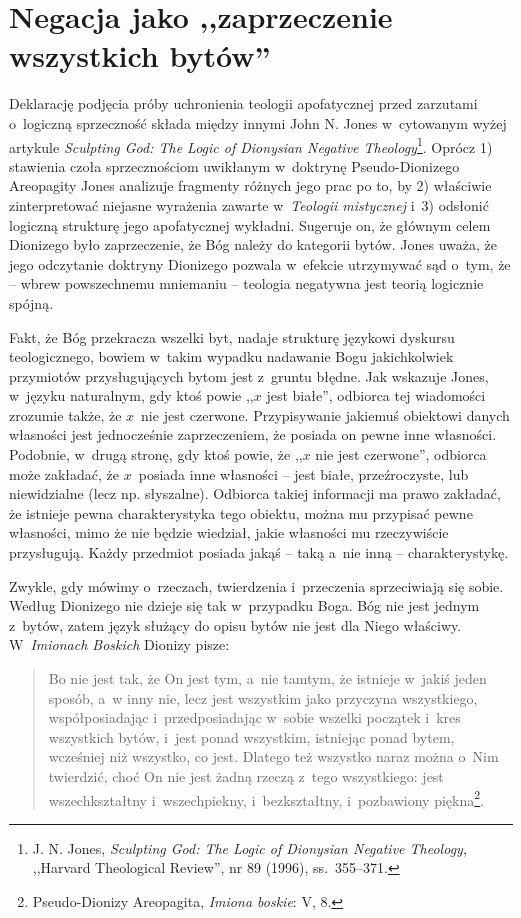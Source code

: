 \chapter{Negacja jako ,,zaprzeczenie wszystkich bytów''}\label{sil-jones}

Deklarację podjęcia próby uchronienia teologii apofatycznej przed zarzutami o~logiczną sprzeczność składa między innymi John N. Jones w~cytowanym wyżej artykule \textit{Sculpting God: The Logic of Dionysian Negative Theology}\footnote{J. N. Jones, \textit{Sculpting God: The Logic of Dionysian Negative Theology}, ,,Harvard Theological Review'', nr 89 (1996), ss.~355–371.}. Oprócz 1) stawienia czoła sprzecznościom uwikłanym w~doktrynę Pseudo-Dionizego Areopagity Jones analizuje fragmenty różnych jego prac po to, by 2) właściwie zinterpretować niejasne wyrażenia zawarte w~\textit{Teologii mistycznej} i~3) odsłonić logiczną strukturę jego apofatycznej wykładni. Sugeruje on, że głównym celem Dionizego było zaprzeczenie, że Bóg należy do kategorii bytów. Jones uważa, że jego odczytanie doktryny Dionizego pozwala w~efekcie utrzymywać sąd o~tym, że -- wbrew powszechnemu mniemaniu -- teologia negatywna jest teorią logicznie spójną.

Fakt, że Bóg przekracza wszelki byt, nadaje strukturę językowi dyskursu teologicznego, bowiem w~takim wypadku nadawanie Bogu jakichkolwiek przymiotów przysługujących bytom jest z~gruntu błędne. Jak wskazuje Jones, w~języku naturalnym, gdy ktoś powie ,,$x$ jest białe'', odbiorca tej wiadomości zrozumie także, że $x$~nie jest czerwone. Przypisywanie jakiemuś obiektowi danych własności jest jednocześnie zaprzeczeniem, że posiada on pewne inne własności. Podobnie, w~drugą stronę, gdy ktoś powie, że ,,$x$ nie jest czerwone'', odbiorca może zakładać, że $x$~posiada inne własności -- jest białe, przeźroczyste, lub niewidzialne (lecz np. słyszalne). Odbiorca takiej informacji ma prawo zakładać, że istnieje pewna charakterystyka tego obiektu, można mu przypisać pewne własności, mimo że nie będzie wiedział, jakie własności mu rzeczywiście przysługują. Każdy przedmiot posiada jakąś -- taką a~nie inną -- charakterystykę.

Zwykle, gdy mówimy o~rzeczach, twierdzenia i~przeczenia sprzeciwiają się sobie. Według Dionizego nie dzieje się tak w~przypadku Boga. Bóg nie jest jednym z~bytów, zatem język służący do opisu bytów nie jest dla Niego właściwy. W~\textit{Imionach Boskich} Dionizy pisze:

\begin{quote}
Bo nie jest tak, że On jest tym, a~nie tamtym, że istnieje w~jakiś jeden sposób, a~w inny nie, lecz jest wszystkim jako przyczyna wszystkiego, współposiadając i~przedposiadając w~sobie wszelki początek i~kres wszystkich bytów, i~jest ponad wszystkim, istniejąc ponad bytem, wcześniej niż wszystko, co jest. Dlatego też wszystko naraz można o~Nim twierdzić, choć On nie jest żadną rzeczą z~tego wszystkiego: jest wszechkształtny i~wszechpiekny, i~bezkształtny, i~pozbawiony piękna\footnote{Pseudo-Dionizy Areopagita, \textit{Imiona boskie}: V, 8.}.
\end{quote}


